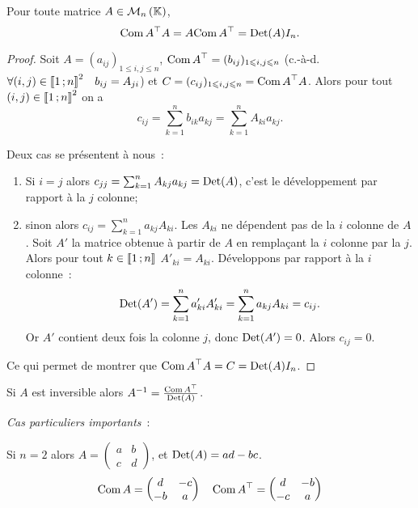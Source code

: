 \begin{prop}
  Pour toute matrice $A \in \mathcal{M}_{n}\left(\mathbb{K}\right)$,
  \begin{equation}
    {\operatorname{Com}A}^{\top} A = A {\operatorname{Com} A}^{\top} = \operatorname{Det}(A) I_n.
  \end{equation}
\end{prop}
\begin{proof}
  Soit $A=(a_{ij})_{1 \leqslant i,j \leqslant n}$, ${\operatorname{Com} A}^{\top} = (b_{ij})_{1 \leqslant i,j \leqslant n}$ (c.-à-d. $\forall (i,j) \in \mathopen{\llbracket}1\mathclose{}\mathpunct{};n\mathclose{\rrbracket}^2 \quad b_{ij}=A_{ji}$) et $C=(c_{ij})_{1 \leqslant i,j \leqslant n}={\operatorname{Com} A}^{\top} A$. Alors pour tout $(i,j) \in \mathopen{\llbracket}1\mathclose{}\mathpunct{};n\mathclose{\rrbracket}^2$ on a
  \begin{equation}
    c_{ij} = \sum_{k=1}^n b_{ik}a_{kj} = \sum_{k=1}^n A_{ki} a_{kj}.
  \end{equation}

Deux cas se présentent à nous~:
\begin{enumerate}
\item Si $i=j$ alors $c_{jj} = \sum_{k=1}^n A_{kj} a_{kj} = \operatorname{Det}(A)$, c'est le développement par rapport à la $j$\ieme{} colonne;
\item sinon alors $c_{ij} = \sum_{k=1}^n a_{kj} A_{ki}$. Les $A_{ki}$ ne dépendent pas de la $i$\ieme{} colonne de $A$. Soit $A'$ la matrice obtenue à partir de $A$ en remplaçant la $i$\ieme{} colonne par la $j$\ieme{}. Alors pour tout $k \in \mathopen{\llbracket}1\mathclose{}\mathpunct{};n\mathclose{\rrbracket}$ $A'_{ki}=A_{ki}$. Développons par rapport à la $i$\ieme{} colonne~:
  \begin{equation}
    \operatorname{Det}(A') = \sum_{k=1}^n a'_{ki} A'_{ki} = \sum_{k=1}^n a_{kj} A_{ki} =c_{ij}.
  \end{equation}
  Or $A'$ contient deux fois la colonne $j$, donc $\operatorname{Det}(A')=0$. Alors $c_{ij}=0$.
\end{enumerate}

Ce qui permet de montrer que ${\operatorname{Com} A}^{\top} A = C = \operatorname{Det}(A) I_n$.
\end{proof}
\begin{corth}
  Si $A$ est inversible alors $A^{-1} = \frac{{\operatorname{Com} A}^{\top}}{\operatorname{Det}(A)}$.
\end{corth}

\emph{Cas particuliers importants}~:

Si $n=2$ alors $A=\begin{pmatrix} a & b \\ c & d \end{pmatrix}$, et $\operatorname{Det}(A)=ad-bc$.
\begin{equation}
  \operatorname{Com} A = \begin{pmatrix} d & -c \\ -b & a \end{pmatrix} \quad   {\operatorname{Com}A}^{\top} = \begin{pmatrix} d & -b \\ -c & a \end{pmatrix}
\end{equation}

